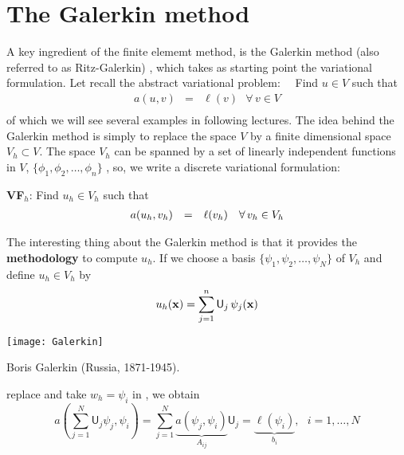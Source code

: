 \section{The Galerkin method}

A key ingredient of the finite elememt method, is the
Galerkin method (also referred to as Ritz-Galerkin) ,
which takes as starting point the variational formulation. 
Let recall the abstract variational problem:~~
Find $u \in V$ such that
\begin{equation}
\left.
\begin{array}{rll}
a(u,v) & = & \ell(v)  ~~~\forall \, v \in V \\
\end{array}
\right. \nonumber
\end{equation}
of which we will see several examples in following lectures.
The idea behind the Galerkin method is simply to replace
the space $V$ by a finite dimensional space $V_h \subset V$.
The space $V_h$ can be spanned by a set of linearly
independent functions in $V$, $\{\phi_1,\phi_2,\dots,\phi_n\}$
,
so, we write a discrete variational formulation:

\begin{kaobox}[backgroundcolor={blue!10!white}]
\textbf{VF}$_h$: Find $u_h \in V_h$ such that
\begin{equation}
\left.
\begin{array}{rll}
a(u_h,v_h) & = & \ell(v_h)  ~~~\forall \,v_h \in V_h \\
\end{array}
\right. \labeq{absVPdisc}
\end{equation}
\end{kaobox}

The interesting thing about the Galerkin method is that it provides
the \textbf{methodology} to compute $u_h$. If we choose a basis
$\{\psi_1,\psi_2,\dots,\psi_N\}$ of $V_h$ and define $u_h \in V_h$ by
\begin{equation}
u_h(\mathbf{x}) = \sum_{j=1}^{n}{\mathsf{U}_j \, \psi_j(\mathbf{x})} \labeq{ansatzuh}
\end{equation}
\begin{marginfigure}[0.0cm]
	\texttt{[image: Galerkin]}
	\caption[]{Boris Galerkin (Russia, 1871-1945).}
\end{marginfigure}
replace  and take $w_h = \psi_i$ in ,
we obtain
\begin{equation}
a\left (\sum_{j=1}^{N}{\mathsf{U}_j\psi_j}, \psi_i\right) = \sum_{j=1}^{N}{\underbrace{a(\psi_j,\psi_i)}_{A_{ij}}\mathsf{U}_j} =
\underbrace{\ell(\psi_i)}_{b_i},~~~i=1,\dots,N
\end{equation}

